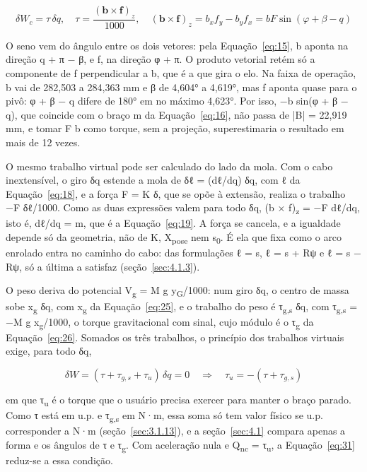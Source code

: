 \begin{equation}
  \delta W_{c} = \tau\,\delta q,\quad\tau = \frac{{(\mathbf{b} \times \mathbf{f})}_{z}}{1000},\quad{(\mathbf{b} \times \mathbf{f})}_{z} = b_{x}f_{y} - b_{y}f_{x} = bF\sin{(\varphi + \beta - q)}
  \label{eq:27}
\end{equation}

O seno vem do ângulo entre os dois vetores: pela Equação~\eqref{eq:15}, b aponta na direção q + π − β, e f, na direção φ + π. O produto vetorial retém só a componente de f perpendicular a b, que é a que gira o elo. Na faixa de operação, b vai de 282,503 a 284,363 mm e β de 4,604° a 4,619°, mas f aponta quase para o pivô: φ + β − q difere de 180° em no máximo 4,623°. Por isso, −b sin(φ + β − q), que coincide com o braço m da Equação~\eqref{eq:16}, não passa de |B| = 22,919 mm, e tomar F b como torque, sem a projeção, superestimaria o resultado em mais de 12 vezes.

O mesmo trabalho virtual pode ser calculado do lado da mola. Com o cabo inextensível, o giro δq estende a mola de δℓ = (dℓ/dq) δq, com ℓ da Equação~\eqref{eq:18}, e a força F = K δ, que se opõe à extensão, realiza o trabalho −F δℓ/1000. Como as duas expressões valem para todo δq, (b × f)\textsubscript{z} = −F dℓ/dq, isto é, dℓ/dq = m, que é a Equação~\eqref{eq:19}. A força se cancela, e a igualdade depende só da geometria, não de K, X\textsubscript{pose} nem s\textsubscript{0}. É ela que fixa como o arco enrolado entra no caminho do cabo: das formulações ℓ = s, ℓ = s + Rψ e ℓ = s − Rψ, só a última a satisfaz (seção~\ref{sec:4.1.3}).

O peso deriva do potencial V\textsubscript{g} = M g y\textsubscript{G}/1000: num giro δq, o centro de massa sobe x\textsubscript{g} δq, com x\textsubscript{g} da Equação~\eqref{eq:25}, e o trabalho do peso é τ\textsubscript{g,s} δq, com τ\textsubscript{g,s} = −M g x\textsubscript{g}/1000, o torque gravitacional com sinal, cujo módulo é o τ\textsubscript{g} da Equação~\eqref{eq:26}. Somados os três trabalhos, o princípio dos trabalhos virtuais exige, para todo δq,

\begin{equation}
  \delta W = (\tau + \tau_{g,s} + \tau_{u})\,\delta q = 0\quad \Rightarrow \quad\tau_{u} = - (\tau + \tau_{g,s})
  \label{eq:28}
\end{equation}

em que τ\textsubscript{u} é o torque que o usuário precisa exercer para manter o braço parado. Como τ está em u.p. e τ\textsubscript{g,s} em N·m, essa soma só tem valor físico se u.p. corresponder a N·m (seção~\ref{sec:3.1.13}), e a seção~\ref{sec:4.1} compara apenas a forma e os ângulos de τ e τ\textsubscript{g}. Com aceleração nula e Q\textsubscript{nc} = τ\textsubscript{u}, a Equação~\eqref{eq:31} reduz-se a essa condição.

